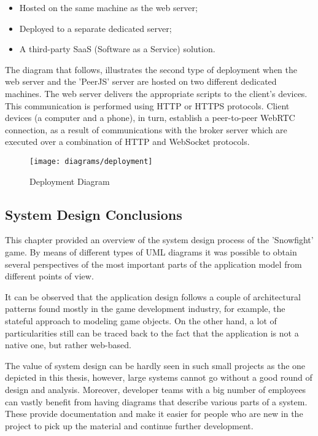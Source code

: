 \begin{itemize}
	\item Hosted on the same machine as the web server;
	\item Deployed to a separate dedicated server;
	\item A third-party SaaS (Software as a Service) solution.
\end{itemize}

The diagram that follows, illustrates the second type of deployment when the web
server and the 'PeerJS' server are hosted on two different dedicated machines.
The web server delivers the appropriate scripts to the client's devices. This
communication is performed using HTTP or HTTPS protocols. Client devices (a
computer and a phone), in turn, establish a peer-to-peer WebRTC connection, as a
result of communications with the broker server which are executed over a
combination of HTTP and WebSocket protocols.

\begin{figure}[!h]
\centering
\texttt{[image: diagrams/deployment]}
\caption{Deployment Diagram}\label{diag:deployment}
\end{figure}

\newpage

\subsection{System Design Conclusions}

This chapter provided an overview of the system design process of the
'Snowfight' game. By means of different types of UML diagrams it was possible to
obtain several perspectives of the most important parts of the application model
from different points of view.

It can be observed that the application design follows a couple of architectural
patterns found mostly in the game development industry, for example, the
stateful approach to modeling game objects. On the other hand, a lot of
particularities still can be traced back to the fact that the application is not
a native one, but rather web-based.

The value of system design can be hardly seen in such small projects as the one
depicted in this thesis, however, large systems cannot go without a good round
of design and analysis. Moreover, developer teams with a big number of employees
can vastly benefit from having diagrams that describe various parts of a system.
These provide documentation and make it easier for people who are new in the
project to pick up the material and continue further development.

\clearpage
